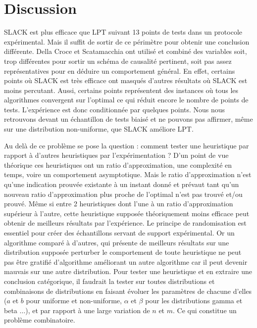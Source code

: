\documentclass[a4paper,12pt]{report}
\theoremstyle{plain}				%
\theoremstyle{definition}				%
\begin{document}
\section{Discussion} \label{sec:discussion}

SLACK est plus efficace que LPT suivant 13 points de tests dans un protocole expérimental. 
Mais il suffit de sortir de ce périmètre pour obtenir une conclusion différente. 
Della Croce et Scatamacchia ont utilisé et combiné des variables 
  soit, trop différentes pour sortir un schéma de causalité pertinent, 
  soit pas assez représentatives pour en déduire un comportement général.  
En effet, certains points où SLACK est très efficace ont masqués 
  d'autres résultats où SLACK est moins percutant.
Aussi, certains points représentent des instances où tous les algorithmes convergent sur l'optimal 
ce qui réduit encore le nombre de points de tests. 
L'expérience est donc conditionnée par quelques points. 
Nous nous retrouvons devant un échantillon de tests biaisé et ne pouvons pas affirmer, 
  même sur une distribution non-uniforme, 
  que SLACK améliore LPT. 

Au delà de ce problème se pose la question : comment tester une heuristique par rapport à d'autres heuristiques par l'expérimentation ?
D'un point de vue théorique ces heuristiques ont un ratio d'approximation, 
  une complexité en temps, voire un comportement asymptotique. 
Mais le ratio d’approximation n’est qu'une indication prouvée existante 
  à un instant donné et prévaut tant qu'un nouveau ratio d'approximation 
  plus proche de l'optimal n'est pas trouvé et/ou prouvé. 
Même si entre 2 heuristiques dont l'une à un ratio d'approximation 
  supérieur à l'autre, cette heuristique supposée théoriquement moins 
  efficace peut obtenir de meilleurs résultats par l'expérience.      
Le principe de randomisation est essentiel pour créer des échantillons servant 
  de support expérimental. 
Or un algorithme comparé à d'autres, qui présente de meilleurs résultats 
  sur une distribution supposée perturber le comportement de toute heuristique 
  ne peut pas être gratifié d'algorithme améliorant un autre algorithme 
  car il peut devenir mauvais sur une autre distribution. 
Pour tester une heuristique et en extraire une conclusion catégorique, 
  il faudrait la tester sur toutes distributions et combinaisons 
  de distributions en faisant évoluer les paramètres de chacune d'elles 
 ($a$ et $b$ pour uniforme et non-uniforme, $\alpha$ et $\beta$ 
  pour les distributions gamma et beta $\ldots$), 
  et par rapport à une large variation de $n$ et $m$.  
Ce qui constitue un problème combinatoire.
\end{document}
